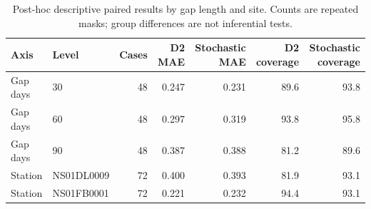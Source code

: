 \begin{table}[p]\centering\scriptsize
\caption{Post-hoc descriptive paired results by gap length and site. Counts are repeated masks; group differences are not inferential tests.}\label{tab:ns-exploratory-detail}
\begin{tabular}{llrrrrr}\toprule
Axis & Level & Cases & D2 MAE & Stochastic MAE & D2 coverage & Stochastic coverage\\\midrule
Gap days & 30 & 48 & 0.247 & 0.231 & 89.6 & 93.8\\
Gap days & 60 & 48 & 0.297 & 0.319 & 93.8 & 95.8\\
Gap days & 90 & 48 & 0.387 & 0.388 & 81.2 & 89.6\\
Station & NS01DL0009 & 72 & 0.400 & 0.393 & 81.9 & 93.1\\
Station & NS01FB0001 & 72 & 0.221 & 0.232 & 94.4 & 93.1\\
\bottomrule\end{tabular}
\end{table}
